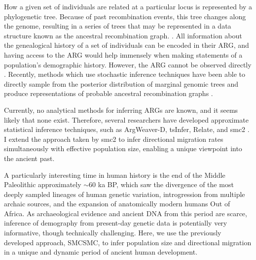 How a given set of individuals are related at a particular locus is represented by a phylogenetic tree.  Because of past recombination events, this tree changes along the genome, resulting in a series of trees that may be represented in a data structure known as the ancestral recombination graph. \cite{Rasmussen2014}. 
All information about the genealogical history of a set of individuals can be encoded in their ARG, and having access to the ARG would help immensely when making statements of a population’s demographic history.  However, the ARG cannot be observed directly \cite{Speidel2019}. 
Recently, methods which use stochastic inference techniques have been able to directly sample from the posterior distribution of marginal genomic trees and produce representations of probable ancestral recombination graphs \cite{Speidel2019, Kelleher2019, Rasmussen2014}.

Currently, no analytical methods for inferring ARGs are known, and it seems likely that none exist.  
Therefore, several researchers have developed approximate statistical inference techniques, such as ArgWeaver-D, tsInfer, Relate, and \gls{smc2} \cite{Speidel2019,Kelleher2019,Rasmussen2014,10.1371/journal.pone.0247647}.
I extend the approach taken by \gls{smc2} to infer directional migration rates simultaneously with effective population size, enabling a unique viewpoint into the ancient past.


A particularly interesting time in human history is the end of the Middle Paleolithic approximately $\sim$60 ka BP, which saw the divergence of the most deeply sampled lineages of human genetic variation, introgression from multiple archaic sources, and the expansion of anatomically modern humans Out of Africa. 
As archaeological evidence and ancient DNA from this period are scarce, inference of demography from present-day genetic data is potentially very informative, though technically challenging. Here, we use the previously developed approach, SMCSMC, to infer population size and directional migration in a unique and dynamic period of ancient human development.

